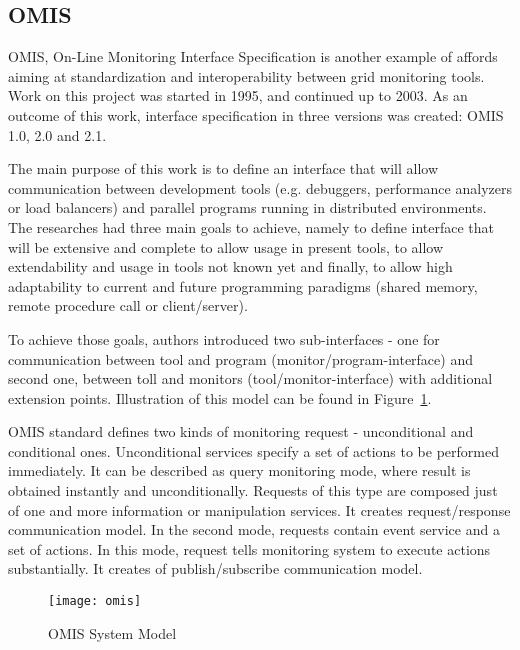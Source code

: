 
\subsection{OMIS}
\label{ssec:omis}

OMIS, On-Line Monitoring Interface Specification is another example of affords aiming at standardization and interoperability between grid
monitoring tools. Work on this project was started in 1995, and continued up to 2003. As an outcome of this work, interface specification in three
versions was created: OMIS 1.0\cite{OMIS1}, 2.0\cite{OMIS2} and 2.1.

The main purpose of this work is to define an interface that will allow communication between development tools (e.g. debuggers, performance
analyzers or load balancers) and parallel programs running in distributed environments. The researches had three main goals to achieve, namely to
define interface that will be extensive and complete to allow usage in present tools, to allow extendability and usage in tools not known yet
and finally, to allow high adaptability to current and future programming paradigms (shared memory, remote procedure call or client/server).

To achieve those goals, authors introduced two sub-interfaces - one for communication between tool and program (monitor/program-interface) and
second one, between toll and monitors (tool/monitor-interface) with additional extension points. Illustration of this model can be found in Figure~\ref{fig:omis}. 

OMIS standard defines two kinds of monitoring request - unconditional and conditional ones. Unconditional services specify a set of actions to be
performed immediately. It can be described as query monitoring mode, where result is obtained instantly and unconditionally. Requests of this type
are composed just of one and more information or manipulation services. It creates request/response communication model. In the second
mode, requests contain event service and a set of actions. In this mode, request tells monitoring system to execute actions substantially. It
creates of publish/subscribe communication model.

\begin{figure}[ht]
  \centering
  \texttt{[image: omis]}
  \caption{OMIS System Model}
  \label{fig:omis}
\end{figure}
  

